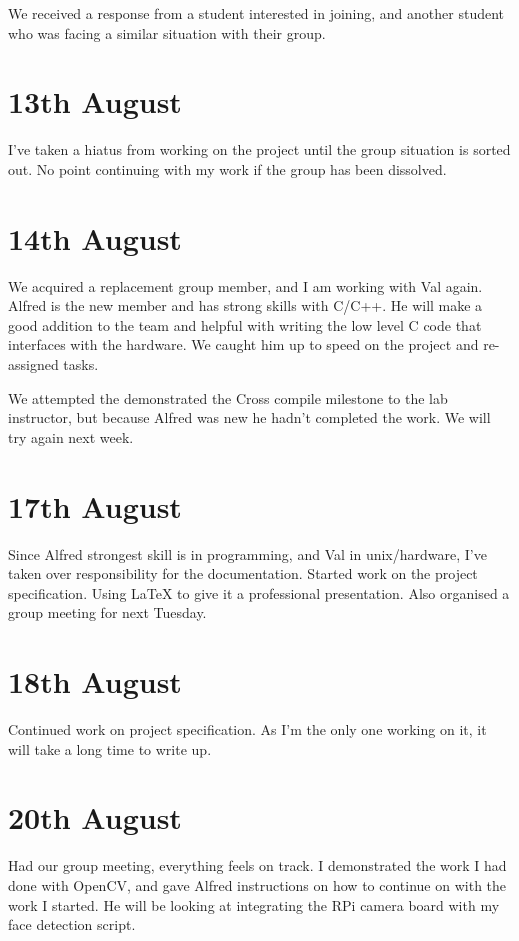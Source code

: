 We received a response from a student interested in joining, and another student who was facing a similar situation with their group.



\section*{13th August}


I've taken a hiatus from working on the project until the group situation is sorted out. No point continuing with my work if the group has been dissolved.

\section*{14th August}

We acquired a replacement group member, and I am working with Val again. Alfred is the new member and has strong skills with C/C++. He will make a good addition to the team and helpful with writing the low level C code that interfaces with the hardware. We caught him up to speed on the project and re-assigned tasks.

We attempted the demonstrated the Cross compile milestone to the lab instructor, but because Alfred was new he hadn't completed the work. We will try again next week.

\section*{17th August}

Since Alfred strongest skill is in programming, and Val in unix/hardware, I've taken over responsibility for the documentation. Started work on the project specification. Using LaTeX to give it a professional presentation. Also organised a group meeting for next Tuesday.


\section*{18th August}

Continued work on project specification. As I'm the only one working on it, it will take a long time to write up.

\section*{20th August}


Had our group meeting, everything feels on track. I demonstrated the work I had done with OpenCV, and gave Alfred instructions on how to continue on with the work I started. He will be looking at integrating the RPi camera board with my face detection script.

